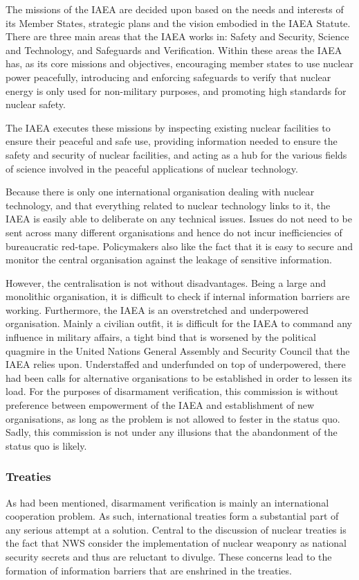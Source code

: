 \documentclass[twoside,titlepage,11pt,twocolumn,a4paper]{article}
\begin{document}
The missions of the IAEA are decided upon based on the needs and
interests of its Member States, strategic plans and the vision
embodied in the IAEA Statute. There are three main areas that the IAEA
works in: Safety and Security, Science and Technology, and Safeguards
and Verification. Within these areas the IAEA has, as its core
missions and objectives, encouraging member states to use nuclear
power peacefully, introducing and enforcing safeguards to verify that
nuclear energy is only used for non-military purposes, and promoting
high standards for nuclear safety.

The IAEA executes these missions by inspecting existing nuclear
facilities to ensure their peaceful and safe use, providing
information needed to ensure the safety and security of nuclear
facilities, and acting as a hub for the various fields of science
involved in the peaceful applications of nuclear technology.

Because there is only one international organisation dealing with
nuclear technology, and that everything related to nuclear technology
links to it, the IAEA is easily able to deliberate on any technical
issues. Issues do not need to be sent across many different
organisations and hence do not incur inefficiencies of bureaucratic
red-tape. Policymakers also like the fact that it is easy to secure
and monitor the central organisation against the leakage of sensitive
information.

However, the centralisation is not without disadvantages. Being a
large and monolithic organisation, it is difficult to check if
internal information barriers are working. Furthermore, the IAEA is an
overstretched and underpowered organisation. Mainly a civilian outfit,
it is difficult for the IAEA to command any influence in military
affairs, a tight bind that is worsened by the political quagmire in
the United Nations General Assembly and Security Council that the IAEA
relies upon. Understaffed and underfunded on top of underpowered,
there had been calls for alternative organisations to be established
in order to lessen its load. For the purposes of disarmament
verification, this commission is without preference between
empowerment of the IAEA and establishment of new organisations, as
long as the problem is not allowed to fester in the status quo. Sadly,
this commission is not under any illusions that the abandonment of the
status quo is likely.

\subsubsection{Treaties}
As had been mentioned, disarmament verification is mainly an
international cooperation problem. As such, international treaties
form a substantial part of any serious attempt at a solution. Central
to the discussion of nuclear treaties is the fact that NWS consider
the implementation of nuclear weaponry as national security secrets
and thus are reluctant to divulge. These concerns lead to the
formation of information barriers that are enshrined in the treaties.
\end{document}
